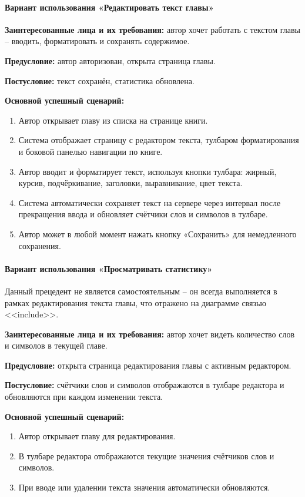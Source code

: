 \paragraph{Вариант использования «Редактировать текст главы»}

\textbf{Заинтересованные лица и их требования:} автор хочет работать с текстом главы -- вводить, форматировать и сохранять содержимое.

\textbf{Предусловие:} автор авторизован, открыта страница главы.

\textbf{Постусловие:} текст сохранён, статистика обновлена.

\textbf{Основной успешный сценарий:}
\begin{enumerate}
    \item Автор открывает главу из списка на странице книги.
    \item Система отображает страницу с редактором текста, тулбаром форматирования и боковой панелью навигации по книге.
    \item Автор вводит и форматирует текст, используя кнопки тулбара: жирный, курсив, подчёркивание, заголовки, выравнивание, цвет текста.
    \item Система автоматически сохраняет текст на сервере через интервал после прекращения ввода и обновляет счётчики слов и символов в тулбаре.
    \item Автор может в любой момент нажать кнопку «Сохранить» для немедленного сохранения.
\end{enumerate}

\paragraph{Вариант использования «Просматривать статистику»}

Данный прецедент не является самостоятельным -- он всегда выполняется в рамках редактирования текста главы, что отражено на диаграмме связью <<include>>.

\textbf{Заинтересованные лица и их требования:} автор хочет видеть количество слов и символов в текущей главе.

\textbf{Предусловие:} открыта страница редактирования главы с активным редактором.

\textbf{Постусловие:} счётчики слов и символов отображаются в тулбаре редактора и обновляются при каждом изменении текста.

\textbf{Основной успешный сценарий:}
\begin{enumerate}
    \item Автор открывает главу для редактирования.
    \item В тулбаре редактора отображаются текущие значения счётчиков слов и символов.
    \item При вводе или удалении текста значения автоматически обновляются.
\end{enumerate}

